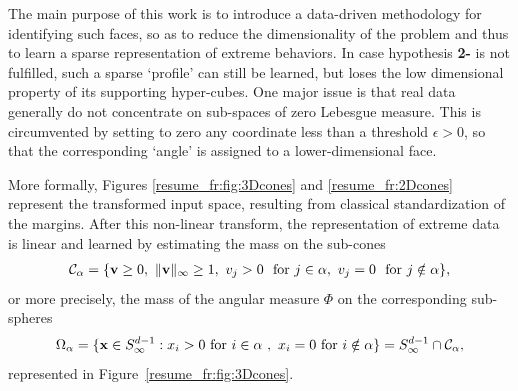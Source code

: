 The main purpose of this work is to introduce a data-driven methodology for identifying such faces, so as to reduce the
dimensionality of the problem and thus to learn a sparse representation  of extreme behaviors. 
In case hypothesis \textbf{2-} is not fulfilled, such a sparse  `profile' can still be learned, but loses the low dimensional property of its supporting hyper-cubes.
One major issue is that real data generally do not concentrate on sub-spaces of zero Lebesgue measure. This is circumvented by setting to zero any coordinate less than a threshold $\epsilon>0$, so that the corresponding `angle' is assigned to a lower-dimensional face. 

More formally, Figures \ref{resume_fr:fig:3Dcones} and \ref{resume_fr:2Dcones} represent the transformed input space, resulting from classical standardization of the margins. After this non-linear transform, the representation of extreme data is linear and learned by estimating the mass on the sub-cones
\begin{align*}
 \mathcal{C}_\alpha = \{\mathbf v \ge 0,~\|\mathbf v\|_\infty \ge 1,~ v_j > 0 ~\text{ for } j \in \alpha,~ v_j = 0 ~\text{ for } j \notin \alpha \},
\end{align*}
or more precisely, the mass of the angular measure $\Phi$ on the corresponding sub-spheres
\begin{align*}
\Omega_{\alpha}  = \{\mathbf x \in S_{\infty}^{d-1} :  x_i > 0 \text{ for } i\in\alpha~,~  x_i = 0 \text{ for } i\notin \alpha   \} 
 = S_{\infty}^{d-1}\cap {\mathcal{C}}_\alpha,
\end{align*}
represented in Figure~\ref{resume_fr:fig:3Dcones}.

